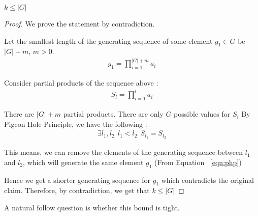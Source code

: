 \begin{proposition}
$k \leq |G|$
\end{proposition}
\begin{proof}
We prove the statement by contradiction. 

Let the smallest length of the generating sequence of 
some element $g_1 \in G$ be $|G| + m$, $m>0$.
\begin{align}
g_1 = \prod\limits_{i=1}^{|G|+m} a_i
\end{align}

Consider partial products of the sequence above : 
\begin{align}
S_l = \prod\limits_{i=1}^{l} a_i
\end{align}

There are $|G|+m$ partial products.
There are only $G$ possible values for $S_i$ 
By Pigeon Hole Principle, we have the following :
\begin{align}
\label{eqn:php}
\exists l_1, l_2 ~~ l_1 < l_2 ~~ S_{l_1} = S_{l_2}
\end{align}

This means, we can remove the elements of the generating
sequence between $l_1$ and $l_2$, which will generate the
same element $g_1$ (From Equation ~\ref{eqn:php})

Hence we get a shorter generating sequence for $g_1$ 
which contradicts the original claim.
Therefore, by contradiction, we get that $k \leq |G|$
\end{proof}

A natural follow question is whether this bound is tight.


